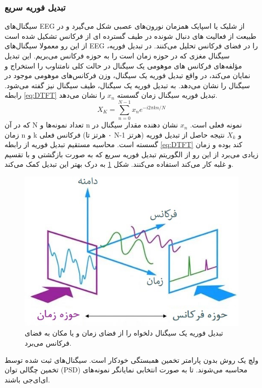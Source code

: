 \subsubsection{تبدیل فوریه سریع}
\label{sssection:FFT}
سیگنال‌های EEG از شلیک یا اسپایک
همزمان نورون‌های عصبی شکل می‌گیرد و در طبیعت از فعالیت های دنبال شونده در طیف گسترده ای از فرکانس تشکیل شده است از این رو معمولا سیگنال‌های EEG را در فضای فرکانس تحلیل می‌کنند.
\cite{hu2019eeg}
در تبدیل فوریه، سیگنال مغزی که در حوزه زمان است را به حوزه فرکانس می‌بریم. این تبدیل مؤلفه‌های فرکانس ‌های موهومی یک سیگنال در حالت کلی نامتناوب را استخراج و نمایان می‌کند، در واقع تبدیل فوریه یک سیگنال، وزن فرکانس‌های موهومی موجود در سیگنال را نشان می‌دهد. به تبدیل فوریه یک سیگنال، طیف سیگنال
 نیز گفته می‌شود.
 رابطه 
 \eqref{eq:DTFT}
 تبدیل فوریه سیگنال زمان گسسته
$  x_{n} $
 را نشان می‌دهد.
 \begin{equation}\label{eq:DTFT}
 X_{K}=\sum_{n=0}^{N-1}x_{n}e^{-i2\pi kn/N}
 \end{equation}
 که در آن N تعداد نمونه‌ها و n نمونه‌ فعلی است. $ x_{n} $ نشان دهنده مقدار سیگنال در زمان n و k  فرکانس فعلی (۰ هرتز تا N-1 هرتز) و $ X_{k} $ نتیجه حاصل از تبدیل فوریه گسسته است.
 محاسبه مستقیم تبدیل فوریه از رابطه
 \eqref{eq:DTFT}
 کند بوده و زمان زیادی می‌برد از این رو از الگوریتم تبدیل فوریه سریع که به صورت بازگشتی و با تقسیم و غلبه کار‌ می‌کند استفاده می‌کنند.
 شکل 
 \ref{fig:signal-analysis}
 به درک بهتر این تبدیل کمک می‌کند.
 \begin{figure}[h]
 	\centering
 	\includegraphics[width=0.7\linewidth]{figures/Signal-Analysis}
 	\caption[تبدیل فوریه]{تبدیل فوریه یک سیگنال دلخواه را از فضای زمان و یا مکان به فضای فرکانس می‌برد.\cite{fourier_transform}
 	}
 	\label{fig:signal-analysis}
 \end{figure}
 ولچ
 یک روش بدون پارامتر تخمین همبستگی خودکار
 است. سیگنال‌های ثبت شده توسط تخمین چگالی توان (PSD)
 محاسبه‌‌ می‌شوند. تا به صورت انتخابی نمایانگر نمونه‌های ای‌ای‌جی باشند.
